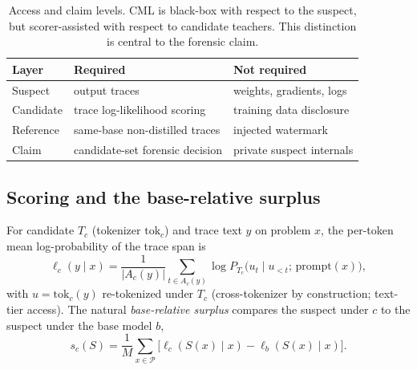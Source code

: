 \begin{table}[t]\centering\small
\caption{Access and claim levels. CML is black-box with respect to the suspect, but
scorer-assisted with respect to candidate teachers. This distinction is central to
the forensic claim.}
\label{tab:access}
\begin{tabular}{@{}p{}p{}p{}@{}}
\toprule
Layer & Required & Not required \\
\midrule
Suspect & output traces & weights, gradients, logs \\
Candidate & trace log-likelihood scoring & training data disclosure \\
Reference & same-base non-distilled traces & injected watermark \\
Claim & candidate-set forensic decision & private suspect internals \\
\bottomrule
\end{tabular}
\end{table}

\subsection{Scoring and the base-relative surplus}
\label{sec:method:stat}
For candidate $T_c$ (tokenizer $\mathrm{tok}_c$) and trace text $y$ on problem $x$,
the per-token mean log-probability of the trace span is
\begin{equation}
\ell_c(y \mid x)=\frac{1}{|A_c(y)|}\sum_{t\in A_c(y)}
  \log P_{T_c}\!\big(u_t \mid u_{<t};\, \mathrm{prompt}(x)\big),
\label{eq:scorelp}
\end{equation}
with $u=\mathrm{tok}_c(y)$ re-tokenized under $T_c$ (cross-tokenizer by construction;
text-tier access). The natural \emph{base-relative surplus} compares the suspect under
$c$ to the suspect under the base model $b$,
\begin{equation}
s_c(S)=\frac{1}{M}\sum_{x\in\mathcal{P}}\big[\ell_c(S(x)\mid x)-\ell_b(S(x)\mid x)\big].
\label{eq:surplus}
\end{equation}

